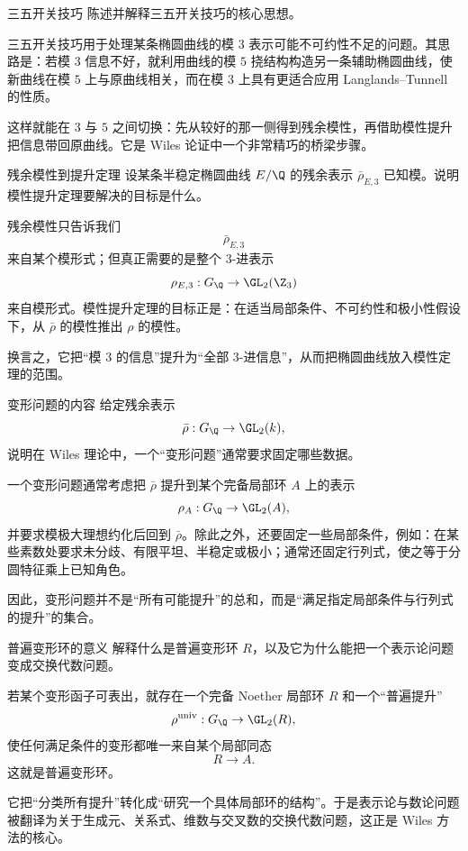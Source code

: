 \begin{problem}{三五开关技巧}
\medium
陈述并解释三五开关技巧的核心思想。
\end{problem}
\begin{solution}
三五开关技巧用于处理某条椭圆曲线的模 $3$ 表示可能不可约性不足的问题。其思路是：若模 $3$ 信息不好，就利用曲线的模 $5$ 挠结构构造另一条辅助椭圆曲线，使新曲线在模 $5$ 上与原曲线相关，而在模 $3$ 上具有更适合应用 Langlands--Tunnell 的性质。

这样就能在 $3$ 与 $5$ 之间切换：先从较好的那一侧得到残余模性，再借助模性提升把信息带回原曲线。它是 Wiles 论证中一个非常精巧的桥梁步骤。
\end{solution}

\begin{problem}{残余模性到提升定理}
\medium
设某条半稳定椭圆曲线 $E/\Q$ 的残余表示 $\bar\rho_{E,3}$ 已知模。说明模性提升定理要解决的目标是什么。
\end{problem}
\begin{solution}
残余模性只告诉我们
\[
\bar\rho_{E,3}
\]
来自某个模形式；但真正需要的是整个 $3$-进表示
\[
\rho_{E,3}:G_\Q\to\GL_2(\Z_3)
\]
来自模形式。模性提升定理的目标正是：在适当局部条件、不可约性和极小性假设下，从 $\bar\rho$ 的模性推出 $\rho$ 的模性。

换言之，它把“模 $3$ 的信息”提升为“全部 $3$-进信息”，从而把椭圆曲线放入模性定理的范围。
\end{solution}

\begin{problem}{变形问题的内容}
\medium
给定残余表示
\[
\bar\rho:G_\Q\to\GL_2(k),
\]
说明在 Wiles 理论中，一个“变形问题”通常要求固定哪些数据。
\end{problem}
\begin{solution}
一个变形问题通常考虑把 $\bar\rho$ 提升到某个完备局部环 $A$ 上的表示
\[
\rho_A:G_\Q\to\GL_2(A),
\]
并要求模极大理想约化后回到 $\bar\rho$。除此之外，还要固定一些局部条件，例如：在某些素数处要求未分歧、有限平坦、半稳定或极小；通常还固定行列式，使之等于分圆特征乘上已知角色。

因此，变形问题并不是“所有可能提升”的总和，而是“满足指定局部条件与行列式的提升”的集合。
\end{solution}

\begin{problem}{普遍变形环的意义}
\medium
解释什么是普遍变形环 $R$，以及它为什么能把一个表示论问题变成交换代数问题。
\end{problem}
\begin{solution}
若某个变形函子可表出，就存在一个完备 Noether 局部环 $R$ 和一个“普遍提升”
\[
\rho^{\mathrm{univ}}:G_\Q\to\GL_2(R),
\]
使任何满足条件的变形都唯一来自某个局部同态
\[
R\to A.
\]
这就是普遍变形环。

它把“分类所有提升”转化成“研究一个具体局部环的结构”。于是表示论与数论问题被翻译为关于生成元、关系式、维数与交叉数的交换代数问题，这正是 Wiles 方法的核心。
\end{solution}


